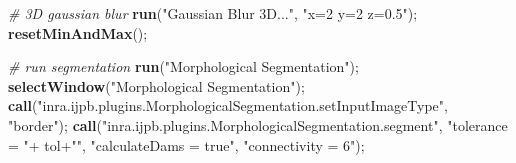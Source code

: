 \documentclass[11pt,singlespacinge,twoside]{reedthesis} %
\newenvironment{Shaded}{}{}
\newcommand{\CommentTok}[1]{\textit{#1}}
\newcommand{\KeywordTok}[1]{\textbf{#1}}
\newcommand{\NormalTok}[1]{#1}
\newcommand{\OperatorTok}[1]{#1}
\newcommand{\StringTok}[1]{#1}
\theoremstyle{definition}
\theoremstyle{definition}
\theoremstyle{definition}
\theoremstyle{remark}
\begin{document}
\scriptsize
\begin{Shaded}
\begin{Highlighting}[numbers=left,,]
\CommentTok{# 3D gaussian blur}
    \KeywordTok{run}\NormalTok{(}\StringTok{"Gaussian Blur 3D..."}\NormalTok{, }\StringTok{"x=2 y=2 z=0.5"}\NormalTok{);}
    \KeywordTok{resetMinAndMax}\NormalTok{();}

\CommentTok{# run segmentation}
    \KeywordTok{run}\NormalTok{(}\StringTok{"Morphological Segmentation"}\NormalTok{);}
    \KeywordTok{selectWindow}\NormalTok{(}\StringTok{"Morphological Segmentation"}\NormalTok{);}
    \KeywordTok{call}\NormalTok{(}\StringTok{"inra.ijpb.plugins.MorphologicalSegmentation.setInputImageType"}\NormalTok{, }\StringTok{"border"}\NormalTok{);}
    \KeywordTok{call}\NormalTok{(}\StringTok{"inra.ijpb.plugins.MorphologicalSegmentation.segment"}\NormalTok{, }\StringTok{"tolerance = "}\OperatorTok{+}\StringTok{ }\NormalTok{tol}\OperatorTok{+}\StringTok{""}\NormalTok{,}
         \StringTok{"calculateDams = true"}\NormalTok{, }\StringTok{"connectivity = 6"}\NormalTok{);}


\end{Highlighting}
\end{Shaded}
\end{document}

